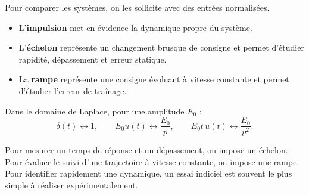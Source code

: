 Pour comparer les systèmes, on les sollicite avec des entrées normalisées.

\SASignauxTests

\begin{itemize}
  \item L'\textbf{impulsion} met en évidence la dynamique propre du système.
  \item L'\textbf{échelon} représente un changement brusque de consigne et permet d'étudier rapidité, dépassement et erreur statique.
  \item La \textbf{rampe} représente une consigne évoluant à vitesse constante et permet d'étudier l'erreur de traînage.
\end{itemize}

Dans le domaine de Laplace, pour une amplitude $E_0$ :
\[
\delta(t)\longleftrightarrow 1,\qquad
E_0u(t)\longleftrightarrow \frac{E_0}{p},\qquad
E_0t\,u(t)\longleftrightarrow \frac{E_0}{p^2}.
\]

\begin{SAapplication}[title={Choisir le bon essai}]
Pour mesurer un temps de réponse et un dépassement, on impose un échelon. Pour évaluer le suivi d'une trajectoire à vitesse constante, on impose une rampe. Pour identifier rapidement une dynamique, un essai indiciel est souvent le plus simple à réaliser expérimentalement.
\end{SAapplication}
